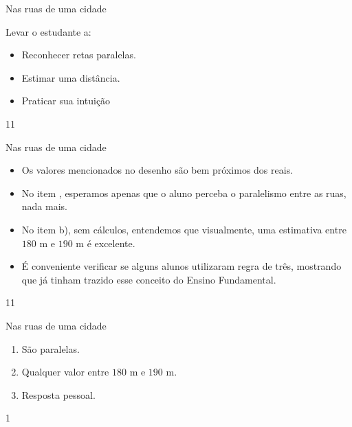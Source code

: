 \begin{objectives}{Nas ruas de uma cidade}
{
Levar o estudante a:
\begin{itemize}
\item {} 
Reconhecer retas paralelas.

\item {} 
Estimar uma distância.

\item {} 
Praticar sua intuição

\end{itemize}
}{1}{1}
\end{objectives}
\begin{sugestions}{Nas ruas de uma cidade}
{
\begin{itemize}
\item {} 
Os valores mencionados no desenho são bem próximos dos reais.

\item {} 
No item , esperamos apenas que o aluno perceba o paralelismo entre as ruas, nada mais.

\item {} 
No item b), sem cálculos, entendemos que visualmente, uma estimativa entre $180$ m e $190$ m é excelente.

\item {} 
É conveniente verificar se alguns alunos utilizaram regra de três, mostrando que já tinham trazido esse conceito do Ensino Fundamental.

\end{itemize}
}{1}{1}
\end{sugestions}
\begin{answer}{Nas ruas de uma cidade}
{
\begin{enumerate}
\item {} 
São paralelas.

\item {} 
Qualquer valor entre $180$ m e $190$ m.

\item {} 
Resposta pessoal.

\end{enumerate}
}{1}
\end{answer}
\clearmargin

